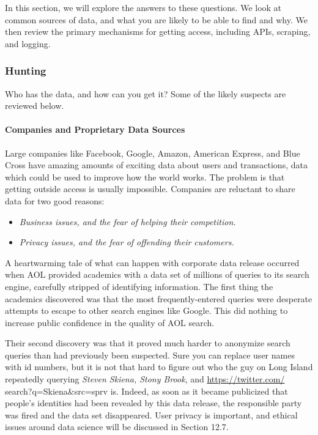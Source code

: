 \documentclass[10pt]{article}
\begin{document}
In this section, we will explore the answers to these questions. We look at common sources of data, and what you are likely to be able to find and why. We then review the primary mechanisms for getting access, including APIs, scraping, and logging.

\subsubsection{Hunting}
Who has the data, and how can you get it? Some of the likely suspects are reviewed below.

\paragraph{Companies and Proprietary Data Sources}
Large companies like Facebook, Google, Amazon, American Express, and Blue Cross have amazing amounts of exciting data about users and transactions, data which could be used to improve how the world works. The problem is that getting outside access is usually impossible. Companies are reluctant to share data for two good reasons:

\begin{itemize}
  \item \textit{Business issues, and the fear of helping their competition.}
  \item \textit{Privacy issues, and the fear of offending their customers.}
\end{itemize}

A heartwarming tale of what can happen with corporate data release occurred when AOL provided academics with a data set of millions of queries to its search engine, carefully stripped of identifying information. The first thing the academics discovered was that the most frequently-entered queries were desperate attempts to escape to other search engines like Google. This did nothing to increase public confidence in the quality of AOL search.

Their second discovery was that it proved much harder to anonymize search queries than had previously been suspected. Sure you can replace user names with id numbers, but it is not that hard to figure out who the guy on Long Island repeatedly querying \textit{Steven Skiena, Stony Brook}, and \href{https://twitter.com/}{https://twitter.com/} search?q=Skiena\&src=sprv is. Indeed, as soon as it became publicized that people's identities had been revealed by this data release, the responsible party was fired and the data set disappeared. User privacy is important, and ethical issues around data science will be discussed in Section 12.7.
\end{document}
